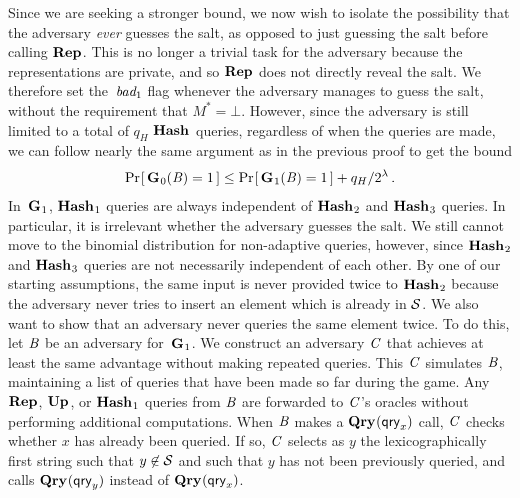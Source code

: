 Since we are seeking a stronger bound, we now wish to isolate the possibility
that the adversary \emph{ever} guesses the salt, as opposed to just guessing the
salt before calling $\textup{\textbf{Rep}}\hspace{0.5pt}$. This is no longer a trivial task for the adversary
because the representations are private, and so $\textup{\textbf{Rep}}\hspace{0.5pt}$ does not directly reveal
the salt. We therefore set the~$\textit{bad}_1$ flag whenever the adversary manages to
guess the salt, without the requirement that $M^* = \bot$. However, since the
adversary is still limited to a total of $q_H$ $\textup{\textbf{Hash}}\hspace{0.5pt}$ queries, regardless of
when the queries are made, we can follow nearly the same argument as in the
previous proof to get the bound
%
\begin{eqnarray}
  \Pr\hspace{-1pt}\left[\,\textup{\textbf{G}}\hspace{0.5pt}_0(\mathit{B})=1\,\right] \leq
    \Pr\hspace{-1pt}\left[\,\textup{\textbf{G}}\hspace{0.5pt}_1(\mathit{B})=1\,\right] + q_H/2^\lambda \,.
\end{eqnarray}
%
In~$\textup{\textbf{G}}\hspace{0.5pt}_1$, $\textup{\textbf{Hash}}\hspace{0.5pt}_1$ queries are always independent of $\textup{\textbf{Hash}}\hspace{0.5pt}_2$ and
$\textup{\textbf{Hash}}\hspace{0.5pt}_3$ queries. In particular, it is irrelevant whether the adversary
guesses the salt.
%
We still cannot move to the binomial distribution for non-adaptive queries,
however, since $\textup{\textbf{Hash}}\hspace{0.5pt}_2$ and $\textup{\textbf{Hash}}\hspace{0.5pt}_3$ queries are not necessarily independent
of each other. By one of our starting assumptions, the same input is never
provided twice to $\textup{\textbf{Hash}}\hspace{0.5pt}_2$ because the adversary never tries to insert an
element which is already in $\mathcal{S}$. We also want to show that an adversary never
queries the same element twice. To do this, let $\mathit{B}$ be an adversary
for~$\textup{\textbf{G}}\hspace{0.5pt}_1$. We construct an adversary $\mathit{C}$ that achieves at least the same
advantage without making repeated queries. This $\mathit{C}$ simulates $\mathit{B}$,
maintaining a list of queries that have been made so far during the
game. Any $\textup{\textbf{Rep}}\hspace{0.5pt}$, $\textup{\textbf{Up}}\hspace{0.5pt}$, or $\textup{\textbf{Hash}}\hspace{0.5pt}_1$ queries from $\mathit{B}$ are forwarded to $\mathit{C}$'s
oracles without performing additional computations. When $\mathit{B}$ makes a
$\textup{\textbf{Qry}}\hspace{0.5pt}(\mathsf{qry}_x)$ call, $\mathit{C}$ checks whether $x$ has already been queried. If
so, $\mathit{C}$ selects as $y$ the lexicographically first string such that
$y \not\in \mathcal{S}$ and such that $y$ has not been previously
queried, and calls $\textup{\textbf{Qry}}\hspace{0.5pt}(\mathsf{qry}_y)$ instead of $\textup{\textbf{Qry}}\hspace{0.5pt}(\mathsf{qry}_x)$.

